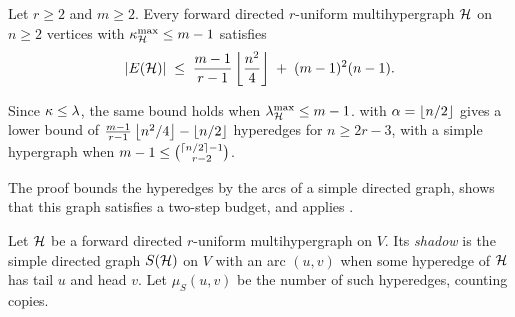 \begin{theorem}\label{thm:dir-hyper-constant}
Let $r \ge 2$ and $m \ge 2$. Every forward directed $r$-uniform multihypergraph
$\mathcal{H}$ on $n \ge 2$ vertices with $\kappa^{\max}_{\mathcal{H}} \le m-1$ satisfies
\[
    |E(\mathcal{H})| \;\le\; \frac{m-1}{r-1}\left\lfloor \frac{n^2}{4} \right\rfloor \;+\; (m-1)^2 (n-1).
\]

\end{theorem}

Since $\kappa\le\lambda$, the same bound holds when $\lambda^{\max}_{\mathcal{H}}\le m-1$.  with $\alpha=\left\lfloor n/2 \right\rfloor$ gives a lower bound of $\frac{m-1}{r-1}\left\lfloor n^2/4 \right\rfloor-\left\lfloor n/2 \right\rfloor$ hyperedges for $n\ge 2r-3$, with a simple hypergraph when $m-1\le\binom{\left\lceil n/2 \right\rceil-1}{r-2}$.

The proof bounds the hyperedges by the arcs of a simple directed graph, shows that this graph satisfies a two-step budget, and applies .

\begin{definition}\label{def:one-step-shadow}
Let $\mathcal{H}$ be a forward directed $r$-uniform multihypergraph on $V$. Its \emph{shadow} is the simple directed graph $S(\mathcal{H})$ on $V$ with an arc $(u,v)$ when some hyperedge of $\mathcal{H}$ has tail $u$ and head $v$. Let $\mu_S(u,v)$ be the number of such hyperedges, counting copies.
\end{definition}

